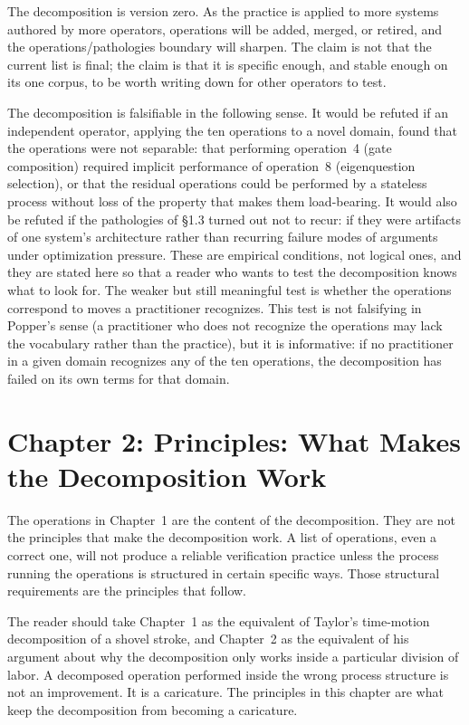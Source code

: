 \documentclass[11pt]{article}
\begin{document}
The decomposition is version zero. As the practice is applied to more systems authored by more operators, operations will be added, merged, or retired, and the operations/pathologies boundary will sharpen. The claim is not that the current list is final; the claim is that it is specific enough, and stable enough on its one corpus, to be worth writing down for other operators to test.

The decomposition is falsifiable in the following sense. It would be refuted if an independent operator, applying the ten operations to a novel domain, found that the operations were not separable: that performing operation~4 (gate composition) required implicit performance of operation~8 (eigenquestion selection), or that the residual operations could be performed by a stateless process without loss of the property that makes them load-bearing. It would also be refuted if the pathologies of \S1.3 turned out not to recur: if they were artifacts of one system's architecture rather than recurring failure modes of arguments under optimization pressure. These are empirical conditions, not logical ones, and they are stated here so that a reader who wants to test the decomposition knows what to look for. The weaker but still meaningful test is whether the operations correspond to moves a practitioner recognizes. This test is not falsifying in Popper's sense (a practitioner who does not recognize the operations may lack the vocabulary rather than the practice), but it is informative: if no practitioner in a given domain recognizes any of the ten operations, the decomposition has failed on its own terms for that domain.

\section{Chapter 2: Principles: What Makes the Decomposition Work}

The operations in Chapter~1 are the content of the decomposition. They are not the principles that make the decomposition work. A list of operations, even a correct one, will not produce a reliable verification practice unless the process running the operations is structured in certain specific ways. Those structural requirements are the principles that follow.

The reader should take Chapter~1 as the equivalent of Taylor's time-motion decomposition of a shovel stroke, and Chapter~2 as the equivalent of his argument about why the decomposition only works inside a particular division of labor. A decomposed operation performed inside the wrong process structure is not an improvement. It is a caricature. The principles in this chapter are what keep the decomposition from becoming a caricature.
\end{document}
